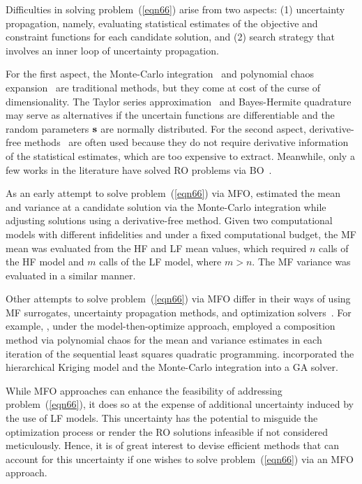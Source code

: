 \documentclass[journal ]{new-aiaa}
\begin{document}
Difficulties in solving problem~(\ref{eqn66}) arise from two aspects: (1) uncertainty propagation, namely, evaluating statistical estimates of the objective and constraint functions for each candidate solution, and (2) search strategy that involves an inner loop of uncertainty propagation.

For the first aspect, the Monte-Carlo integration~\citep{Caflisch1998} and polynomial chaos expansion~\citep{Crestaux2009} are traditional methods, but they come at cost of the curse of dimensionality.
The Taylor series approximation~\citep{Anderson2012} and Bayes-Hermite quadrature~\citep{OHagan1991} may serve as alternatives if the uncertain functions are differentiable and the random parameters $\bf s$ are normally distributed.
For the second aspect, derivative-free methods~\citep{Larson2019} are often used because they do not require derivative information of the statistical estimates, which are too expensive to extract.
Meanwhile, only a few works in the literature have solved RO problems via BO~\citep{Do2021,Daulton2022RMOBO}. 

As an early attempt to solve problem~(\ref{eqn66}) via MFO, \citet{Ng2014} estimated the mean and variance at a candidate solution via the Monte-Carlo integration while adjusting solutions using a derivative-free method.
Given two computational models with different infidelities and under a fixed computational budget, the MF mean was evaluated from the HF and LF mean values, which required $n$ calls of the HF model and $m$ calls of the LF model, where $m>n$.
The MF variance was evaluated in a similar manner.

Other attempts to solve problem~(\ref{eqn66}) via MFO differ in their ways of using MF surrogates, uncertainty propagation methods, and optimization solvers~\citep[see e.g.,][]{Shah2015,Fusi2015,Chakraborty2017,Zhou2018}.
For example, \citet{Shah2015}, under the model-then-optimize approach, employed a composition method via polynomial chaos for the mean and variance estimates in each iteration of the sequential least squares quadratic programming.
\citet{Zhou2018} incorporated the hierarchical Kriging model and the Monte-Carlo integration into a GA solver.

While MFO approaches can enhance the feasibility of addressing problem~(\ref{eqn66}), it does so at the expense of additional uncertainty induced by the use of LF models.
This uncertainty has the potential to misguide the optimization process or render the RO solutions infeasible if not considered meticulously. 
Hence, it is of great interest to devise efficient methods that can account for this uncertainty if one wishes to solve problem~(\ref{eqn66}) via an MFO approach.
\end{document}
